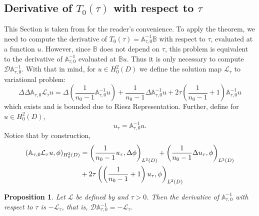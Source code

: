 \documentclass[12pt]{article}
\newtheorem{proposition}{Proposition}
\begin{document}
\subsection{Derivative of $T_0(\tau)$ with respect to $\tau$}\label{derivative}
This Section is taken from \cite{CaMoRo} for the reader's convenience. To apply the theorem, we need to compute the derivative of $T_0(\tau)=\mathbb{A}^{-1}_{\tau,0}\mathbb{B}$ with respect to $\tau$, evaluated at a function $u$. However, since $\mathbb{B}$ does not depend on $\tau$, this problem is equivalent to the derivative of $\mathbb{A}^{-1}_{\tau,0}$ evaluated at $\mathbb{B}u$. Thus it is only necessary to compute ${\mathcal D}\mathbb{A}^{-1}_{\tau,0}$. With that in mind, for $u\in H^2_0(D)$ we define the solution map ${\mathcal L}_\tau$ to variational problem:
\begin{equation}\label{Lt}
\Delta\Delta \mathbb{A}_{\tau,0} {\mathcal L}_\tau u = \Delta \left ( \frac{1}{n_0-1} \mathbb{A}^{-1}_{\tau,0}u\right ) + \frac{1}{n_0-1} \Delta \mathbb{A}^{-1}_{\tau,0} u + 2\tau\left( \frac{1}{n_0-1}+1 \right )\mathbb{A}^{-1}_{\tau,0}u
\end{equation}
which exists and is bounded due to Riesz Representation. Further, define  for $u\in H^2_0(D)$,
\begin{equation}
u_{\tau}=\mathbb{A}^{-1}_{\tau,0}u.
\end{equation} 
Notice that by construction,
\begin{align}\label{derividen}
(\mathbb{A}_{\tau,0} {\mathcal L}_{\tau} u, \phi)_{H^2_0(D)} &=\left ( \frac{1}{n_0-1} u_\tau, \Delta \phi\right)_{L^2(D)} +\left ( \frac{1}{n_0-1} \Delta u_\tau, \phi\right)_{L^2(D)} \notag \\
&+ 2\tau\left ( \left( \frac{1}{n_0-1}+1 \right ) u_\tau, \phi\right )_{L^2(D)}
\end{align}
\begin{proposition} Let ${\mathcal L}$ be defined by  \label{LtP} and  $\tau>0$. Then the  derivative of $\mathbb{A}^{-1}_{\tau,0}$ with respect to $\tau$ is  $-{\mathcal L}_{\tau}$, that is, ${\mathcal D}\mathbb{A}^{-1}_{\tau,0}=-{\mathcal L}_\tau$.
\end{proposition}
\end{document}
